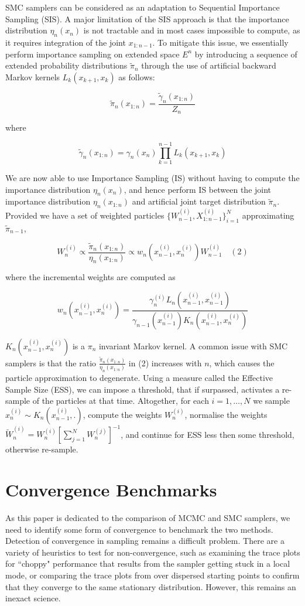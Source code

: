\documentclass[12pt]{elsarticle}
\begin{document}
SMC samplers can be considered as an adaptation to Sequential Importance Sampling (SIS). A major limitation of the SIS approach is that the importance distribution $\eta_n(x_n)$ is not tractable and in most cases impossible to compute, as it requires integration of the joint $x_{1:n-1}$. To mitigate this issue,  we essentially perform importance sampling on extended space $E^n$ by introducing a sequence of extended probability distributions $\tilde{\pi}_n$ through the use of artificial backward Markov kernels $L_k(x_{k+1},x_k)$ as follows:

\[
\tilde{\pi}_n(x_{1:n}) = \frac{\tilde{\gamma}_n(x_{1:n})}{Z_n}
\]

where 

\[
\tilde{\gamma}_n(x_{1:n}) = \gamma_n(x_n) \prod_{k=1}^{n-1} L_k(x_{k+1},x_k)
\]

We are now able to use Importance Sampling (IS) without having to compute the importance distribution $\eta_n(x_n)$, and hence perform IS between the joint importance distribution $\eta_n(x_{1:n})$ and artificial joint target distribution $\tilde{\pi}_n$. Provided we have a set of weighted particles $\{W_{n-1}^{(i)}, X_{1:n-1}^{(i)}\}_{i=1}^N$ approximating $\tilde{\pi}_{n-1}$,

\[
W_n^{(i)} \propto \frac{\tilde{\pi}_n(x_{1:n})}{\eta_n(x_{1:n})} \propto w_n(x_{n-1}^{(i)}, x_n^{(i)})W_{n-1}^{(i)} \quad (2)
\]

where the incremental weights are computed as

\[
w_n(x_{n-1}^{(i)}, x_n^{(i)}) = \frac{\gamma_n^{(i)}L_{n}(x_{n-1}^{(i)}, x_{n-1}^{(i)})}{\gamma_{n-1}(x_{n-1}^{(i)}) K_n(x_{n-1}^{(i)}, x_n^{(i)})}
\]

$K_n(x_{n-1}^{(i)}, x_n^{(i)})$ is a $\pi_n$ invariant Markov kernel. A common issue with SMC samplers is that the ratio $\frac{\tilde{\pi}_n(x_{1:n})}{\eta_n(x_{1:n})}$ in (2) increases with $n$, which causes the particle approximation to degenerate. Using a measure called the Effective Sample Size (ESS), we can impose a threshold, that if surpassed, activates a re-sample of the particles at that time. Altogether, for each $i = 1, \dots, N$ we sample $x_n^{(i)} \sim K_n(x_{n-1}^{(i)}, .)$, compute the weights $W_n^{(i)}$, normalise the weights $\tilde{W}_n^{(i)} = W_n^{(i)}[\sum_{j=1}^N W_n^{(j)}]^{-1}$, and continue for ESS less then some threshold, otherwise re-sample.

\section*{Convergence Benchmarks}
As this paper is dedicated to the comparison of MCMC and SMC samplers, we need to identify some form of convergence to benchmark the two methods. Detection of convergence in sampling remains a difficult problem.  There are a variety of heuristics to test for non-convergence, such as examining the trace plots for ``choppy" performance that results from the sampler getting stuck in a local mode, or comparing the trace plots from over dispersed starting points to confirm that they converge to the same stationary distribution. However, this remains an inexact science.\\
\end{document}
